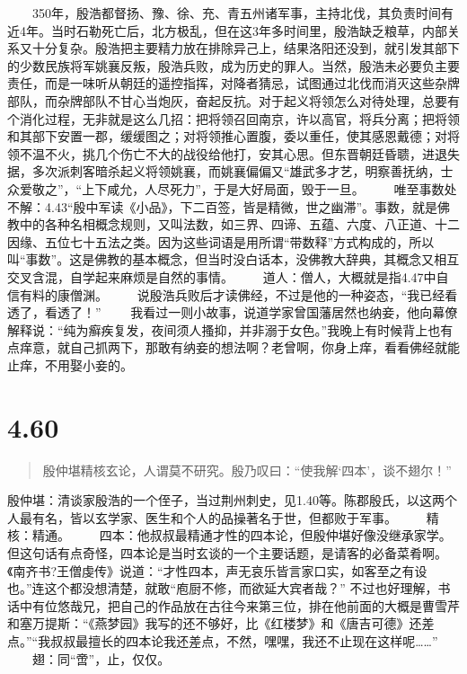 \documentclass[]{book}
\begin{document}
　　350年，殷浩都督扬、豫、徐、充、青五州诸军事，主持北伐，其负责时间有近4年。当时石勒死亡后，北方极乱，但在这3年多时间里，殷浩缺乏粮草，内部关系又十分复杂。殷浩把主要精力放在排除异己上，结果洛阳还没到，就引发其部下的少数民族将军姚襄反叛，殷浩兵败，成为历史的罪人。当然，殷浩未必要负主要责任，而是一味听从朝廷的遥控指挥，对降者猜忌，试图通过北伐而消灭这些杂牌部队，而杂牌部队不甘心当炮灰，奋起反抗。对于起义将领怎么对待处理，总要有个消化过程，无非就是这么几招：把将领召回南京，许以高官，将兵分离；把将领和其部下安置一郡，缓缓图之；对将领推心置腹，委以重任，使其感恩戴德；对将领不温不火，挑几个伤亡不大的战役给他打，安其心思。但东晋朝廷昏聩，进退失据，多次派刺客暗杀起义将领姚襄，而姚襄偏偏又``雄武多才艺，明察善抚纳，士众爱敬之''，``上下咸允，人尽死力''，于是大好局面，毁于一旦。
　　唯至事数处不解：4.43``殷中军读《小品》，下二百签，皆是精微，世之幽滞''。事数，就是佛教中的各种名相概念规则，又叫法数，如三界、四谛、五蕴、六度、八正道、十二因缘、五位七十五法之类。因为这些词语是用所谓``带数释''方式构成的，所以叫``事数''。这是佛教的基本概念，但当时没白话本，没佛教大辞典，其概念又相互交叉含混，自学起来麻烦是自然的事情。
　　道人：僧人，大概就是指4.47中自信有料的康僧渊。
　　说殷浩兵败后才读佛经，不过是他的一种姿态，``我已经看透了，看透了！''
　　我看过一则小故事，说道学家曾国藩居然也纳妾，他向幕僚解释说：``纯为癣疾复发，夜间须人搔抑，并非溺于女色。''我晚上有时候背上也有点痒意，就自己抓两下，那敢有纳妾的想法啊？老曾啊，你身上痒，看看佛经就能止痒，不用娶小妾的。

\section{4.60}\label{section-237}

\begin{quote}
殷仲堪精核玄论，人谓莫不研究。殷乃叹曰：``使我解`四本'，谈不翅尔！''
\end{quote}

殷仲堪：清谈家殷浩的一个侄子，当过荆州刺史，见1.40等。陈郡殷氏，以这两个人最有名，皆以玄学家、医生和个人的品操著名于世，但都败于军事。
　　精核：精通。
　　四本：他叔叔最精通才性的四本论，但殷仲堪好像没继承家学。但这句话有点奇怪，四本论是当时玄谈的一个主要话题，是请客的必备菜肴啊。《南齐书?王僧虔传》说道：``才性四本，声无哀乐皆言家口实，如客至之有设也。''连这个都没想清楚，就敢``庖厨不修，而欲延大宾者哉？''
不过也好理解，书话中有位悠哉兄，把自己的作品放在古往今来第三位，排在他前面的大概是曹雪芹和塞万提斯：``《燕梦园》我写的还不够好，比《红楼梦》和《唐吉可德》还差点。''``我叔叔最擅长的四本论我还差点，不然，嘿嘿，我还不止现在这样呢\ldots{}\ldots{}''
　　翅：同``啻''，止，仅仅。
\end{document}
